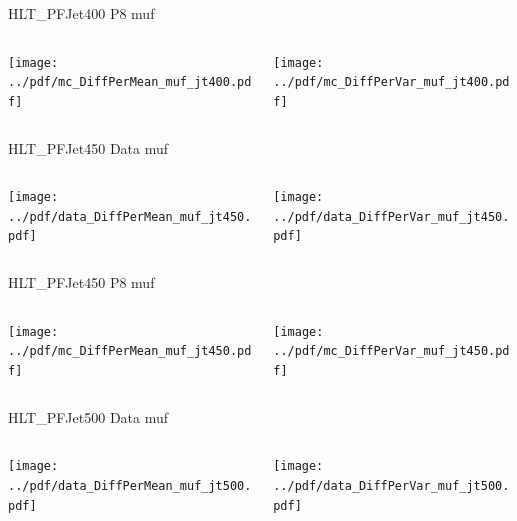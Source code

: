 \documentclass[9pt]{beamer}
\begin{document}
\begin{frame}[t]{HLT\_PFJet400 P8 muf}
\begin{columns}[T]
  \begin{column}{.5\textwidth}
  \texttt{[image: ../pdf/mc\_DiffPerMean\_muf\_jt400.pdf]}
  \end{column}
  \begin{column}{.5\textwidth}
  \texttt{[image: ../pdf/mc\_DiffPerVar\_muf\_jt400.pdf]}
  \end{column}
\end{columns}
\end{frame}

\begin{frame}[t]{HLT\_PFJet450 Data muf}
\begin{columns}[T]
  \begin{column}{.5\textwidth}
  \texttt{[image: ../pdf/data\_DiffPerMean\_muf\_jt450.pdf]}
  \end{column}
  \begin{column}{.5\textwidth}
  \texttt{[image: ../pdf/data\_DiffPerVar\_muf\_jt450.pdf]}
  \end{column}
\end{columns}
\end{frame}

\begin{frame}[t]{HLT\_PFJet450 P8 muf}
\begin{columns}[T]
  \begin{column}{.5\textwidth}
  \texttt{[image: ../pdf/mc\_DiffPerMean\_muf\_jt450.pdf]}
  \end{column}
  \begin{column}{.5\textwidth}
  \texttt{[image: ../pdf/mc\_DiffPerVar\_muf\_jt450.pdf]}
  \end{column}
\end{columns}
\end{frame}

\begin{frame}[t]{HLT\_PFJet500 Data muf}
\begin{columns}[T]
  \begin{column}{.5\textwidth}
  \texttt{[image: ../pdf/data\_DiffPerMean\_muf\_jt500.pdf]}
  \end{column}
  \begin{column}{.5\textwidth}
  \texttt{[image: ../pdf/data\_DiffPerVar\_muf\_jt500.pdf]}
  \end{column}
\end{columns}
\end{frame}
\end{document}
